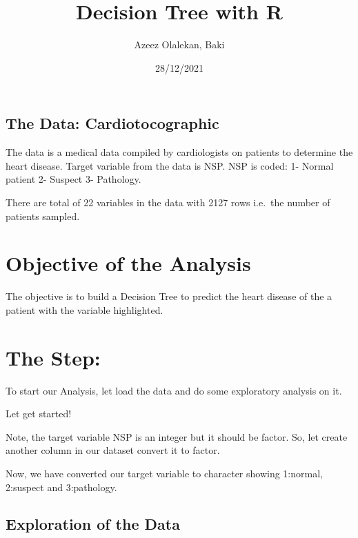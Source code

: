 \documentclass[
]{article}
\title{Decision Tree with R}
\author{Azeez Olalekan, Baki}
\date{28/12/2021}
\newenvironment{Shaded}{\begin{snugshade}}{\end{snugshade}}
\newcommand{\FunctionTok}[1]{\textcolor[rgb]{0.00,0.00,0.00}{#1}}
\newcommand{\NormalTok}[1]{#1}
\newcommand{\OtherTok}[1]{\textcolor[rgb]{0.56,0.35,0.01}{#1}}
\newcommand{\SpecialCharTok}[1]{\textcolor[rgb]{0.00,0.00,0.00}{#1}}
\begin{document}
\maketitle

\hypertarget{the-data-cardiotocographic}{%
\subsection{The Data:
Cardiotocographic}\label{the-data-cardiotocographic}}

The data is a medical data compiled by cardiologists on patients to
determine the heart disease. Target variable from the data is NSP. NSP
is coded: 1- Normal patient 2- Suspect 3- Pathology.

There are total of 22 variables in the data with 2127 rows i.e.~the
number of patients sampled.

\hypertarget{objective-of-the-analysis}{%
\section{Objective of the Analysis}\label{objective-of-the-analysis}}

The objective is to build a Decision Tree to predict the heart disease
of the a patient with the variable highlighted.

\hypertarget{the-step}{%
\section{The Step:}\label{the-step}}

To start our Analysis, let load the data and do some exploratory
analysis on it.

Let get started!

Note, the target variable NSP is an integer but it should be factor. So,
let create another column in our dataset convert it to factor.

\begin{Shaded}
\end{Shaded}

Now, we have converted our target variable to character showing
1:normal, 2:suspect and 3:pathology.

\hypertarget{exploration-of-the-data}{%
\subsection{Exploration of the Data}\label{exploration-of-the-data}}
\end{document}
